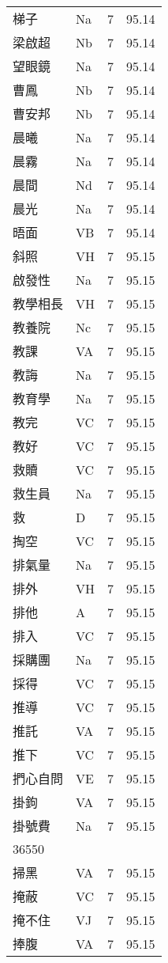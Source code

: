 \documentclass[twocolumn]{book}
\begin{document}
\begin{supertabular}{llrr}
梯子 & Na & 7 &  95.14\\
梁啟超 & Nb & 7 &  95.14\\
望眼鏡 & Na & 7 &  95.14\\
曹鳳 & Nb & 7 &  95.14\\
曹安邦 & Nb & 7 &  95.14\\
晨曦 & Na & 7 &  95.14\\
晨霧 & Na & 7 &  95.14\\
晨間 & Nd & 7 &  95.14\\
晨光 & Na & 7 &  95.14\\
晤面 & VB & 7 &  95.14\\
斜照 & VH & 7 &  95.15\\
啟發性 & Na & 7 &  95.15\\
教學相長 & VH & 7 &  95.15\\
教養院 & Nc & 7 &  95.15\\
教課 & VA & 7 &  95.15\\
教誨 & Na & 7 &  95.15\\
教育學 & Na & 7 &  95.15\\
教完 & VC & 7 &  95.15\\
教好 & VC & 7 &  95.15\\
救贖 & VC & 7 &  95.15\\
救生員 & Na & 7 &  95.15\\
救 & D & 7 &  95.15\\
掏空 & VC & 7 &  95.15\\
排氣量 & Na & 7 &  95.15\\
排外 & VH & 7 &  95.15\\
排他 & A & 7 &  95.15\\
排入 & VC & 7 &  95.15\\
採購團 & Na & 7 &  95.15\\
採得 & VC & 7 &  95.15\\
推導 & VC & 7 &  95.15\\
推託 & VA & 7 &  95.15\\
推下 & VC & 7 &  95.15\\
捫心自問 & VE & 7 &  95.15\\
掛鉤 & VA & 7 &  95.15\\
掛號費 & Na & 7 &  95.15\\
36550\\
掃黑 & VA & 7 &  95.15\\
掩蔽 & VC & 7 &  95.15\\
掩不住 & VJ & 7 &  95.15\\
捧腹 & VA & 7 &  95.15\\

\end{supertabular}
\end{document}
